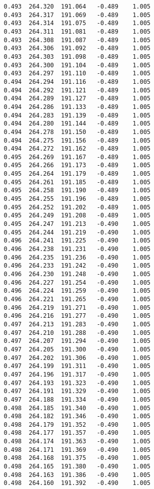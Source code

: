 \begin{verbatim}
   0.493  264.320  191.064   -0.489    1.005
   0.493  264.317  191.069   -0.489    1.005
   0.493  264.314  191.075   -0.489    1.005
   0.493  264.311  191.081   -0.489    1.005
   0.493  264.308  191.087   -0.489    1.005
   0.493  264.306  191.092   -0.489    1.005
   0.493  264.303  191.098   -0.489    1.005
   0.493  264.300  191.104   -0.489    1.005
   0.493  264.297  191.110   -0.489    1.005
   0.494  264.294  191.116   -0.489    1.005
   0.494  264.292  191.121   -0.489    1.005
   0.494  264.289  191.127   -0.489    1.005
   0.494  264.286  191.133   -0.489    1.005
   0.494  264.283  191.139   -0.489    1.005
   0.494  264.280  191.144   -0.489    1.005
   0.494  264.278  191.150   -0.489    1.005
   0.494  264.275  191.156   -0.489    1.005
   0.494  264.272  191.162   -0.489    1.005
   0.495  264.269  191.167   -0.489    1.005
   0.495  264.266  191.173   -0.489    1.005
   0.495  264.264  191.179   -0.489    1.005
   0.495  264.261  191.185   -0.489    1.005
   0.495  264.258  191.190   -0.489    1.005
   0.495  264.255  191.196   -0.489    1.005
   0.495  264.252  191.202   -0.489    1.005
   0.495  264.249  191.208   -0.489    1.005
   0.495  264.247  191.213   -0.490    1.005
   0.495  264.244  191.219   -0.490    1.005
   0.496  264.241  191.225   -0.490    1.005
   0.496  264.238  191.231   -0.490    1.005
   0.496  264.235  191.236   -0.490    1.005
   0.496  264.233  191.242   -0.490    1.005
   0.496  264.230  191.248   -0.490    1.005
   0.496  264.227  191.254   -0.490    1.005
   0.496  264.224  191.259   -0.490    1.005
   0.496  264.221  191.265   -0.490    1.005
   0.496  264.219  191.271   -0.490    1.005
   0.496  264.216  191.277   -0.490    1.005
   0.497  264.213  191.283   -0.490    1.005
   0.497  264.210  191.288   -0.490    1.005
   0.497  264.207  191.294   -0.490    1.005
   0.497  264.205  191.300   -0.490    1.005
   0.497  264.202  191.306   -0.490    1.005
   0.497  264.199  191.311   -0.490    1.005
   0.497  264.196  191.317   -0.490    1.005
   0.497  264.193  191.323   -0.490    1.005
   0.497  264.191  191.329   -0.490    1.005
   0.497  264.188  191.334   -0.490    1.005
   0.498  264.185  191.340   -0.490    1.005
   0.498  264.182  191.346   -0.490    1.005
   0.498  264.179  191.352   -0.490    1.005
   0.498  264.177  191.357   -0.490    1.005
   0.498  264.174  191.363   -0.490    1.005
   0.498  264.171  191.369   -0.490    1.005
   0.498  264.168  191.375   -0.490    1.005
   0.498  264.165  191.380   -0.490    1.005
   0.498  264.163  191.386   -0.490    1.005
   0.498  264.160  191.392   -0.490    1.005

\end{verbatim}
